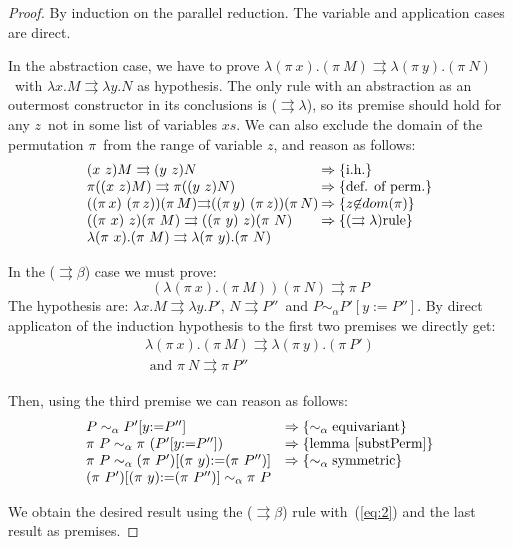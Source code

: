 \documentclass[preprint,10pt]{sigplanconf}
\newcommand{\lam}{\ensuremath{\lambda}}
\newcommand{\alpsym}{\ensuremath{\sim_\alpha}}
\newcommand{\p}{\ensuremath{\rightrightarrows}}
\begin{document}
\begin{proof}
By induction on the parallel reduction. The variable and application cases are direct. 

In the abstraction case,  we have to prove $\lam (\pi\ x) . (\pi\ M)  \p  \lam (\pi\ y) . (\pi\ N)$\ with $\lambda x . M  \p  \lambda y . N$ as hypothesis.
The only rule with an abstraction as an outermost constructor in its conclusions is ($\p\!\!\lam$), so its premise should hold for any $z$\ not in some list of variables $xs$. We can also exclude the domain of the permutation $\pi$\ from the range of variable $z$, and reason as follows: 
%
\[
\begin{array}{l@{\hspace{0.2em}}l}
  (x\ z) M \p (y\ z) N & \Rightarrow  \{\text{i.h.} \} \\
  \pi ((x\ z) M) \p \pi ((y\ z) N) & \Rightarrow \{\text{def. of perm.} \}\\
  ((\pi\,x)\ (\pi\,z)) (\pi\,M) {\p} ((\pi\,y)\ (\pi\,z)) (\pi\,N) & \Rightarrow \{z {\not\in} dom(\pi)\}\\
  ((\pi\ x)\ z) (\pi\ M) \p ((\pi\ y)\ z) (\pi\ N) & \Rightarrow \{(\p\lam) \text{rule}\}\\
  \lam (\pi\ x) . (\pi\ M)  \p  \lam (\pi\ y) . (\pi\ N) & \\
\end{array}
\]

\noindent In the ($\p\!\!\beta$) case we must prove:
%
\[(\lambda (\pi\ x). (\pi\ M)) (\pi\ N)  \p \pi\ P \]
%
The hypothesis are: $\lambda x. M \p \lambda y. P'$, $N \p  P''$\ and $P \alpsym P' [y {:=} P'']$. By direct applicaton of the induction hypothesis to the first two premises we directly get:
%
\begin{equation}
  \label{eq:2}
  \begin{split}
  \lambda (\pi\ x). (\pi\ M) \p \lambda (\pi\ y). (\pi\ P') \\
  \text{ and } \pi\ N \p  \pi\ P''
  \end{split}
\end{equation}

Then, using the third premise we can reason as follows:
\[
\begin{array}{ll}
  P \alpsym P' [y {:=} P''] & \Rightarrow   \{\alpsym\text{equivariant}\}\\
  \pi\ P \alpsym \pi\ (P' [y{:=} P'']) & \Rightarrow  \{\text{lemma~\ref{substPerm}}\} \\
  \pi\ P \alpsym (\pi\ P') [ (\pi\ y) {:=} (\pi\ P'')] & \Rightarrow \{\alpsym\text{symmetric} \}\\
  (\pi\ P') [ (\pi\ y) {:=} (\pi\ P'')] \alpsym \pi\ P &
\end{array}
\]


We obtain the desired result using the (\p$\beta$) rule with~(\ref{eq:2}) and the last result as premises.
\end{proof}
\end{document}
